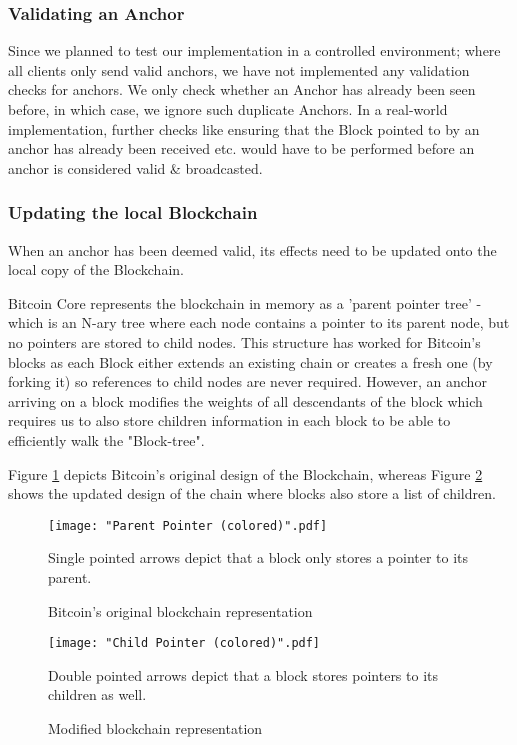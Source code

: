 \subsubsection{Validating an Anchor}

Since we planned to test our implementation in a controlled environment; where all clients only send valid anchors, we have not implemented any validation checks for anchors. 
We only check whether an Anchor has already been seen before, in which case, we ignore such duplicate Anchors.
In a real-world implementation, further checks like ensuring that the Block pointed to by an anchor has already been received etc. would have to be performed before an anchor is considered valid \& broadcasted.

\subsubsection{Updating the local Blockchain}

When an anchor has been deemed valid, its effects need to be updated onto the local copy of the Blockchain.

Bitcoin Core represents the blockchain in memory as a 'parent pointer tree' - which is an N-ary tree where each node contains a pointer to its parent node, but no pointers are stored to child nodes. 
This structure has worked for Bitcoin's blocks as each Block either extends an existing chain or creates a fresh one (by forking it) so references to child nodes are never required.
However, an anchor arriving on a block modifies the weights of all descendants of the block which requires us to also store children information in each block to be able to efficiently walk the "Block-tree".

Figure \ref{fig-impl-parent-pointer} depicts Bitcoin's original design of the Blockchain, whereas 
Figure \ref{fig-impl-child-pointer} shows the updated design of the chain where blocks also store a list of children.

\begin{figure}[!htb]
    \centering
    \texttt{[image: "Parent Pointer (colored)".pdf]}
    \caption{Bitcoin's original blockchain representation}
    
    \medskip
    \footnotesize
    Single pointed arrows depict that a block only stores a pointer to its parent.
    \label{fig-impl-parent-pointer}
\end{figure}

\begin{figure}[!htb]
    \centering
    \texttt{[image: "Child Pointer (colored)".pdf]}
    \caption{Modified blockchain representation}
    
    \medskip
    \footnotesize
    Double pointed arrows depict that a block stores pointers to its children as well.
    \label{fig-impl-child-pointer}
\end{figure}

